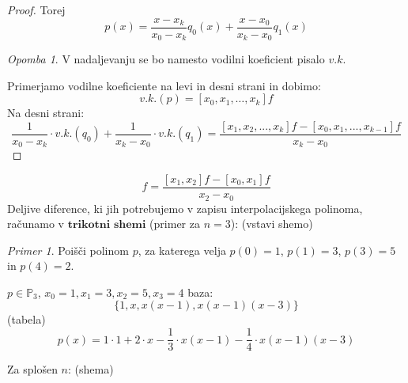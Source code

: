 \documentclass[a4paper,12pt]{article}
\theoremstyle{definition}
\theoremstyle{remark}
\newtheorem*{ex}{Primer}
\newtheorem*{rem}{Opomba}
\newcommand{\Pp}{\mathbb{P}}
\newcounter{subsubsubsection}[subsubsection]
\begin{document}
\begin{proof}
    Torej
    \begin{equation*}
        p(x) = \frac{x-x_k}{x_0-x_k} q_0(x) + \frac{x-x_0}{x_k-x_0} q_1(x)
    \end{equation*}
    \begin{rem}
        V nadaljevanju se bo namesto vodilni koeficient pisalo $v.k.$
    \end{rem}
    Primerjamo vodilne koeficiente na levi in desni strani in dobimo:
    \begin{equation*}
        v.k.(p) = [x_0, x_1, \dots, x_k]f
    \end{equation*}
    Na desni strani:
    \begin{equation*}
        \frac{1}{x_0-x_k} \cdot v.k. (q_0) + \frac{1}{x_k - x_0} \cdot v.k. (q_1) = \frac{[x_1, x_2, ..., x_k] f - [x_0, x_1, ..., x_{k-1}] f}{x_k - x_0}
    \end{equation*}
\end{proof}

\begin{equation*}
    [x_0, x_1, x_2] f = \frac{[x_1, x_2]f - [x_0, x_1] f}{x_2 - x_0}
\end{equation*}
Deljive diference, ki jih potrebujemo v zapisu interpolacijskega polinoma, računamo v $\textbf{trikotni shemi}$ (primer za $n = 3$):
(vstavi shemo)


\begin{ex}
    Poišči polinom $p$, za katerega velja $p(0) = 1$, $p(1) = 3$, $p(3) = 5$ in $p(4) = 2$.

    $p \in \Pp_3$, $x_0 = 1, x_1 =3,  x_2 = 5, x_3 = 4$
    baza:
    \begin{equation*}
        \{1, x, x(x-1), x(x-1)(x-3)\}
    \end{equation*}
    (tabela)
    \begin{equation*}
        p(x) = 1 \cdot 1 + 2 \cdot x - \frac{1}{3} \cdot x(x-1) - \frac{1}{4} \cdot x(x-1)(x-3)
    \end{equation*}
\end{ex}

Za splošen $n$:
(shema)
\end{document}
